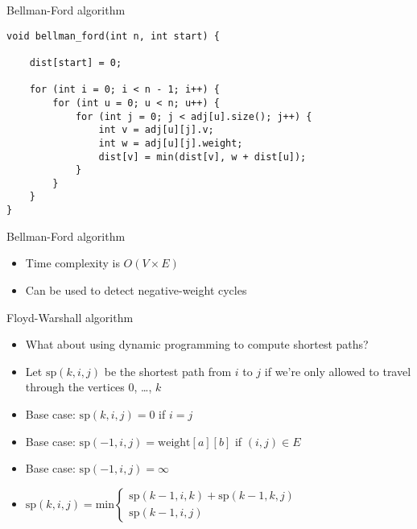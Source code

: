 \documentclass[12pt,t]{beamer}
\newcommand{\bi}{\begin{itemize}}
\newcommand{\ei}{\end{itemize}}
\begin{document}
\begin{frame}[fragile]{Bellman-Ford algorithm}
    \begin{verbatim}
void bellman_ford(int n, int start) {

    dist[start] = 0;

    for (int i = 0; i < n - 1; i++) {
        for (int u = 0; u < n; u++) {
            for (int j = 0; j < adj[u].size(); j++) {
                int v = adj[u][j].v;
                int w = adj[u][j].weight;
                dist[v] = min(dist[v], w + dist[u]);
            }
        }
    }
}
    \end{verbatim}
\end{frame}

\begin{frame}{Bellman-Ford algorithm}
    \vspace{50pt}
    \bi
        \item Time complexity is $O(V\times E)$
        \vspace{10pt}
        \item Can be used to detect negative-weight cycles
    \ei
\end{frame}

\begin{frame}{Floyd-Warshall algorithm}
    \vspace{20pt}
    \bi
        \item What about using dynamic programming to compute shortest paths?
        \vspace{10pt}
    \item Let $\mathrm{sp}(k, i, j)$ be the shortest path from $i$ to $j$ if we're only allowed to travel through the vertices $0$, \ldots, $k$
        \vspace{5pt}
    \item Base case: $\mathrm{sp}(k, i, j) = 0$ if $i = j$
    \item Base case: $\mathrm{sp}(-1, i, j) = \mathrm{weight}[a][b]$ if $(i,j) \in E$
    \item Base case: $\mathrm{sp}(-1, i, j) = \infty$
        \vspace{5pt}
    \item $\mathrm{sp}(k, i, j) = \mathrm{min} \left\{
	\begin{array}{l}
        \mathrm{sp}(k - 1, i, k) + \mathrm{sp}(k - 1, k, j) \\
        \mathrm{sp}(k - 1, i, j)
	\end{array}
\right.$
    \ei
\end{frame}
\end{document}

